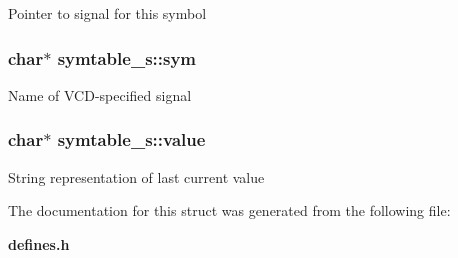Pointer to signal for this symbol 
\subsubsection{\setlength{\rightskip}{0pt plus 5cm}char$\ast$ symtable\_\-s::sym}\label{structsymtable__s_m0}


Name of VCD-specified signal 
\subsubsection{\setlength{\rightskip}{0pt plus 5cm}char$\ast$ symtable\_\-s::value}\label{structsymtable__s_m2}


String representation of last current value 

The documentation for this struct was generated from the following file:\begin{CompactItemize}
\item 
{\bf defines.h}\end{CompactItemize}
